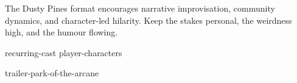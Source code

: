 The Dusty Pines format encourages narrative improvisation, community dynamics, and character-led hilarity. Keep the stakes personal, the weirdness high, and the humour flowing.

{recurring-cast}
{player-characters}

{trailer-park-of-the-arcane}
